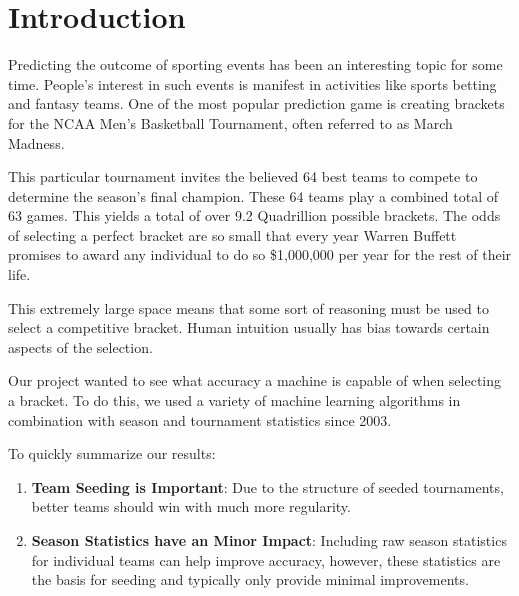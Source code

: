 \section{Introduction}

Predicting the outcome of sporting events has been an interesting topic for some time.
People's interest in such events is manifest in activities like sports betting and fantasy teams.
One of the most popular prediction game is creating brackets for the NCAA Men's Basketball Tournament, often referred to as March Madness.

This particular tournament invites the believed 64 best teams to compete to determine the season's final champion.
These 64 teams play a combined total of 63 games.
This yields a total of over 9.2 Quadrillion possible brackets.
The odds of selecting a perfect bracket are so small that every year Warren Buffett promises to award any individual to do so \$1,000,000 per year for the rest of their life.

This extremely large space means that some sort of reasoning must be used to select a competitive bracket.
Human intuition usually has bias towards certain aspects of the selection.

Our project wanted to see what accuracy a machine is capable of when selecting a bracket.
To do this, we used a variety  of machine learning algorithms in combination with season and tournament statistics since 2003.

To quickly summarize our results:
\begin{enumerate}
	\item \textbf{Team Seeding is Important}: Due to the structure of seeded tournaments, better teams should win with much more regularity.
	\item \textbf{Season Statistics have an Minor Impact}: Including raw season statistics for individual teams can help improve accuracy, however, these statistics are the basis for seeding and typically only provide minimal improvements.
\end{enumerate}